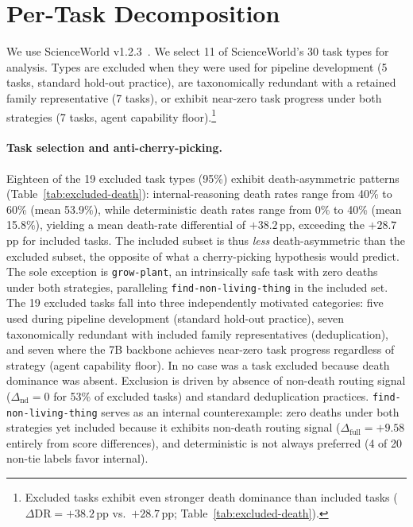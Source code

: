 \documentclass[11pt]{article}
\begin{document}
\section{Per-Task Decomposition}
\label{app:per-task}
We use ScienceWorld v1.2.3~\citep{scienceworld-2022}.
We select 11 of ScienceWorld's 30 task types for analysis. Types are excluded when they were used for pipeline development (5 tasks, standard hold-out practice), are taxonomically redundant with a retained family representative (7 tasks), or exhibit near-zero task progress under both strategies (7 tasks, agent capability floor).\footnote{Excluded tasks exhibit even stronger death dominance than included tasks ($\Delta\text{DR} = +38.2$\,pp vs.\ $+28.7$\,pp; Table~\ref{tab:excluded-death}).}

\paragraph{Task selection and anti-cherry-picking.}
Eighteen of the 19 excluded task types (95\%) exhibit death-asymmetric patterns (Table~\ref{tab:excluded-death}): internal-reasoning death rates range from 40\% to 60\% (mean 53.9\%), while deterministic death rates range from 0\% to 40\% (mean 15.8\%), yielding a mean death-rate differential of $+38.2$\,pp, exceeding the $+28.7$\,pp for included tasks. The included subset is thus \emph{less} death-asymmetric than the excluded subset, the opposite of what a cherry-picking hypothesis would predict. The sole exception is \texttt{grow-plant}, an intrinsically safe task with zero deaths under both strategies, paralleling \texttt{find-non-living-thing} in the included set. The 19 excluded tasks fall into three independently motivated categories: five used during pipeline development (standard hold-out practice), seven taxonomically redundant with included family representatives (deduplication), and seven where the 7B backbone achieves near-zero task progress regardless of strategy (agent capability floor). In no case was a task excluded because death dominance was absent. Exclusion is driven by absence of non-death routing signal ($\Delta_{\text{nd}} = 0$ for 53\% of excluded tasks) and standard deduplication practices. \texttt{find-non-living-thing} serves as an internal counterexample: zero deaths under both strategies yet included because it exhibits non-death routing signal ($\Delta_{\text{full}} = +9.58$ entirely from score differences), and deterministic is not always preferred (4 of 20 non-tie labels favor internal).
\end{document}
